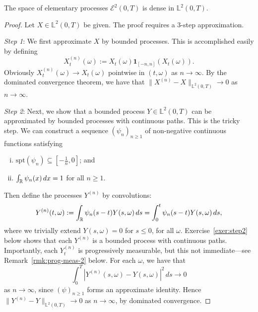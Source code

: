 \begin{theorem}
\label{thm:approx-processes}
    The space of elementary processes $\mathcal{E}^2(0,T)$ is dense in $\mathbb{L}^2(0,T)$.
\end{theorem}

\begin{proof}
    Let $X\in\mathbb{L}^2(0,T)$ be given. The proof requires a 3-step approximation.

    \emph{Step 1}: We first approximate $X$ by bounded processes. This is accomplished easily by defining
    \begin{equation*}
        X^{(n)}_t(\omega) := X_t(\omega) \mathbf{1}_{[-n,n]}(X_t(\omega)).
    \end{equation*}
    Obviously $X^{(n)}_t(\omega) \to X_t(\omega)$ pointwise in $(t,\omega)$ as $n\to\infty$. By the dominated convergence theorem, we have that $\|X^{(n)}-X\|_{\mathbb{L}^2(0,T)} \to 0$ as $n\to\infty$.

    \emph{Step 2}: Next, we show that a bounded process $Y\in\mathbb{L}^2(0,T)$ can be approximated by bounded processes with continuous paths. This is the tricky step. We can construct a sequence $(\psi_n)_{n\ge 1}$ of non-negative continuous functions satisfying
    \begin{enumerate}[(i)]
        \item $\mathrm{spt}(\psi_n)\subseteq [-\frac{1}{n},0]$; and
        \item $\int_{\mathbb{R}} \psi_n(x)\,dx = 1$ for all $n\ge 1$.
    \end{enumerate}
    Then define the processes $Y^{(n)}$ by convolutions:
    \begin{equation}
    \label{eq:}
        Y^{(n)}(t,\omega) := \int_{\mathbb{R}} \psi_n(s-t)Y(s,\omega)\,ds = \int_0^t \psi_n(s-t)Y(s,\omega)\,ds,
    \end{equation}
    where we trivially extend $Y(s,\omega)=0$ for $s\le 0$, for all $\omega$. Exercise~\ref{exer:step2} below shows that each $Y^{(n)}$ is a bounded process with continuous paths. Importantly, each $Y^{(n)}_t$ is progressively measurable, but this not immediate---see Remark~\ref{rmk:prog-meas-2} below. For each $\omega$, we have that
    \begin{equation*}
        \int_0^T |Y^{(n)}(s,\omega)-Y(s,\omega)|^2\,ds \to 0
    \end{equation*}
    as $n\to\infty$, since $(\psi)_{n\ge 1}$ forms an approximate identity. Hence $\|Y^{(n)}-Y\|_{\mathbb{L}^2(0,T)} \to 0$ as $n\to\infty$, by dominated convergence.


\end{proof}
